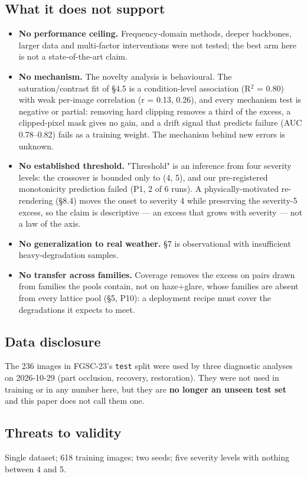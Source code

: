 \subsection{What it does not support}
\begin{itemize}
\item \textbf{No performance ceiling.} Frequency-domain methods, deeper backbones, larger data and multi-factor interventions were not tested; the best arm here is not a state-of-the-art claim.
\item \textbf{No mechanism.} The novelty analysis is behavioural. The saturation/contrast fit of §4.5 is a condition-level association (R$^2$ = 0.80) with weak per-image correlation (r = 0.13, 0.26), and every mechanism test is negative or partial: removing hard clipping removes a third of the excess, a clipped-pixel mask gives no gain, and a drift signal that predicts failure (AUC 0.78--0.82) fails as a training weight. The mechanism behind new errors is unknown.
\item \textbf{No established threshold.} "Threshold" is an inference from four severity levels: the crossover is bounded only to (4, 5), and our pre-registered monotonicity prediction failed (P1, 2 of 6 runs). A physically-motivated re-rendering (§8.4) moves the onset to severity 4 while preserving the severity-5 excess, so the claim is descriptive --- an excess that grows with severity --- not a law of the axis.
\item \textbf{No generalization to real weather.} §7 is observational with insufficient heavy-degradation samples.
\item \textbf{No transfer across families.} Coverage removes the excess on pairs drawn from families the pools contain, not on haze+glare, whose families are absent from every lattice pool (§5, P10): a deployment recipe must cover the degradations it expects to meet.
\end{itemize}
\subsection{Data disclosure}
The 236 images in FGSC-23's \texttt{test} split were used by three diagnostic analyses on 2026-10-29 (part occlusion, recovery, restoration). They were not used in training or in any number here, but they are \textbf{no longer an unseen test set} and this paper does not call them one.

\subsection{Threats to validity}
Single dataset; 618 training images; two seeds; five severity levels with nothing between 4 and 5.

